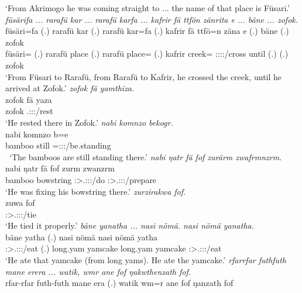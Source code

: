 \begin{exe}
	\trans `From Akrimogo he was coming straight to ... the name of that place is Füsari.'
	\emph{füsärifa ... rarafü kar ... rarafü karfa ... kafrir fä ttfön zänrita e ... bäne ... zofok.}\\
	\gll füsäri=fa (.) rarafü kar (.) rarafü kar=fa (.) kafrir fä ttfö=n zäna e (.) bäne (.) zofok\\ 
	füsäri=\Abl{} (.) rarafü place (.) rarafü place=\Abl{} (.) kafrir \Dist{} creek=\Loc{} \Sg:\Sbj:\Pst:\Pfv:\Venit/cross until (.) \Recog{} (.) zofok\\
	\trans `From Füsari to Rarafü, from Rarafü to Kafrir, he crossed the creek, until he arrived at Zofok.'
	\emph{zofok fä yamthiza.}\\
	\gll zofok fä yaza\\ 
	zofok \Dist{} \Tsg.\Masc:\Sbj:\Pst:\Ipfv/rest\\
	\trans `He rested there in Zofok.'
	\emph{nabi komnzo bekogr.}\\
	\gll nabi komnzo b=e\\ 
	bamboo still \Med=\Stpl:\Sbj:\Nonpast:\Stat/be.standing \\\
	\trans `The bamboos are still standing there.'
	\emph{nabi ŋatr fä fof zurärm zwafrmnzrm.}\\
	\gll nabi ŋatr fä fof zurm zwanzrm\\ 
	bamboo bowstring \Dist{} \Emph{} \Sg:\Sbj>\Tsg.\F:\Obj:\Pst:\Dur/do \Sg:\Sbj>\Tsg.\F:\Obj:\Pst:\Dur/prepare\\
	\trans `He was fixing his bowstring there.'
	\emph{zurzirakwa fof.}\\
	\gll zuwa fof\\ 
	\Sg:\Sbj>\Tsg.\F:\Obj:\Pst:\Ipfv/tie \Emph\\
	\trans `He tied it properly.'
	\emph{bäne yanatha ... nasi nömä. nasi nömä yanatha.}\\
	\gll bäne yatha (.) nasi nömä nasi nömä yatha\\ 
	\Recog{} \Sg:\Sbj>\Tsg.\Masc:\Obj:\Pst:\Ipfv/eat (.) long.yam yamcake long.yam yamcake \Sg:\Sbj>\Tsg.\Masc:\Obj:\Pst:\Ipfv/eat\\
	\trans `He ate that yamcake (from long yams). He ate the yamcake.'
\exi{118} 
	\emph{rfarrfar futhfuth mane erera ... watik, wmr ane fof ŋakwthenzath fof.}\\
	\gll rfar-rfar futh-futh mane e\stem{rä}ra (.) watik wm=r ane fof ŋanzath fof\\ 

\end{exe}
